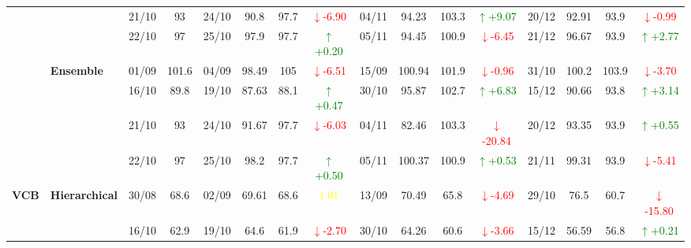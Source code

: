 \documentclass{ieeeaccess}
\begin{document}
{\begin{longtable}{llcc|cccc|cccc|cccc}
&
& 21/10 & 93 & 24/10 & 90.8 & 97.7 & \textcolor{red}{\(\downarrow\)-6.90} & 04/11 & 94.23 & 103.3 & \textcolor{green}{\(\uparrow\)+9.07} & 20/12 & 92.91 & 93.9 & \textcolor{red}{\(\downarrow\)-0.99} \\

&
& 22/10 & 97 & 25/10 & 97.9 & 97.7 & \textcolor{green}{\(\uparrow\)+0.20} & 05/11 & 94.45 & 100.9 & \textcolor{red}{\(\downarrow\)-6.45} & 21/12 & 96.67 & 93.9 & \textcolor{green}{\(\uparrow\)+2.77} \\
\cmidrule(lr){2-16}



& \textbf{Ensemble}
& 01/09 & 101.6 & 04/09 & 98.49 & 105 & \textcolor{red}{\(\downarrow\)-6.51} & 15/09 & 100.94 & 101.9 & \textcolor{red}{\(\downarrow\)-0.96} & 31/10 & 100.2 & 103.9 & \textcolor{red}{\(\downarrow\)-3.70} \\

&
& 16/10 & 89.8 & 19/10 & 87.63 & 88.1 & \textcolor{green}{\(\uparrow\)+0.47} & 30/10 & 95.87 & 102.7 & \textcolor{green}{\(\uparrow\)+6.83} & 15/12 & 90.66 & 93.8 & \textcolor{green}{\(\uparrow\)+3.14} \\

&
& 21/10 & 93 & 24/10 & 91.67 & 97.7 & \textcolor{red}{\(\downarrow\)-6.03} & 04/11 & 82.46 & 103.3 & \textcolor{red}{\(\downarrow\)-20.84} & 20/12 & 93.35 & 93.9 & \textcolor{green}{\(\uparrow\)+0.55} \\

&
& 22/10 & 97 & 25/10 & 98.2 & 97.7 & \textcolor{green}{\(\uparrow\)+0.50} & 05/11 & 100.37 & 100.9 & \textcolor{green}{\(\uparrow\)+0.53} & 21/11 & 99.31 & 93.9 & \textcolor{red}{\(\downarrow\)-5.41} \\
\midrule




\multirow{12}{*}{\textbf{VCB}} 
& \textbf{Hierarchical}
& 30/08 & 68.6 & 02/09 & 69.61 & 68.6 & \textcolor{yellow}{1.01} & 13/09 & 70.49 & 65.8 & \textcolor{red}{\(\downarrow\)-4.69} & 29/10 & 76.5 & 60.7 & \textcolor{red}{\(\downarrow\)-15.80} \\

&
& 16/10 & 62.9 & 19/10 & 64.6 & 61.9 & \textcolor{red}{\(\downarrow\)-2.70} & 30/10 & 64.26 & 60.6 & \textcolor{red}{\(\downarrow\)-3.66} & 15/12 & 56.59 & 56.8 & \textcolor{green}{\(\uparrow\)+0.21} \\


\end{longtable}}
\end{document}
